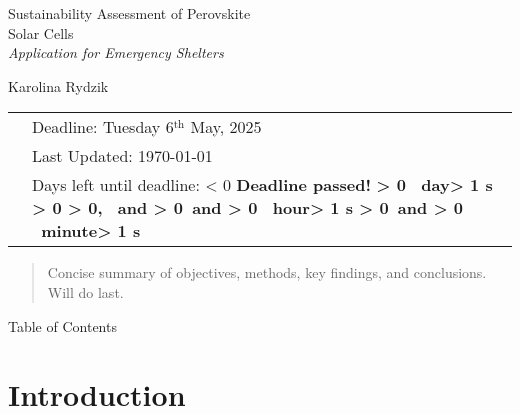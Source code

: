 \documentclass{article}
\newcounter{deadlineyear}\setcounter{deadlineyear}{2025}
\newcounter{deadlinemonth}\setcounter{deadlinemonth}{5} %
\newcounter{deadlineday}\setcounter{deadlineday}{6}
\newcounter{deadlinetime}\setcounter{deadlinetime}{0} %
\newcounter{mydatenumber}
\newcounter{currentdate}
\newcounter{daysdiff}
\newcounter{currenttime}
\newcounter{totalminutes}
\newcounter{displaydays}
\newcounter{remainingmins}
\newcounter{displayhours}
\newcounter{displaymins}
\newcommand{\timeUntilDeadline}{%
	\setmydatenumber{mydatenumber}{\thedeadlineyear}{\thedeadlinemonth}{\thedeadlineday}%
	\setmydatenumber{currentdate}{\the\year}{\the\month}{\the\day}%
	\setcounter{daysdiff}{\themydatenumber - \thecurrentdate}%
	\setcounter{currenttime}{\time}%
	\setcounter{totalminutes}{\thedaysdiff * 1440 + \thedeadlinetime - \thecurrenttime}%
	\ifnum\thetotalminutes < 0
	\textbf{\color{red}Deadline passed!}%
	\else
	\setcounter{displaydays}{\thetotalminutes / 1440}%
	\setcounter{remainingmins}{\thetotalminutes - \thedisplaydays * 1440}%
	\setcounter{displayhours}{\theremainingmins / 60}%
	\setcounter{displaymins}{\theremainingmins - \thedisplayhours * 60}%
	\textbf{%
		\ifnum\thedisplaydays > 0
		\thedisplaydays\ day\ifnum\thedisplaydays > 1 s\fi%
		\ifnum\thedisplayhours > 0
		\ifnum\thedisplaymins > 0, \else\ and \fi%
		\else
		\ifnum\thedisplaymins > 0\ and \fi%
		\fi%
		\fi%
		\ifnum\thedisplayhours > 0
		\thedisplayhours\ hour\ifnum\thedisplayhours > 1 s\fi%
		\ifnum\thedisplaymins > 0\ and \fi%
		\fi%
		\ifnum\thedisplaymins > 0
		\thedisplaymins\ minute\ifnum\thedisplaymins > 1 s\fi%
		\fi%
	}%
	\fi
}
\begin{document}
\thispagestyle{empty}
\vspace*{10em}

\Huge \noindent 
Sustainability Assessment of \textcolor{green!50!black}{Perovskite\\ Solar Cells}\\[1em]
\normalsize \textit{Application for Emergency Shelters}\\
\vspace*{4em}

\noindent \large Karolina Rydzik

\vspace*{\fill}

\normalsize
\hspace*{-2.9em}
\begin{tabular}{@{}l l@{}}
	& Deadline: Tuesday 6$^{\text{th}}$ May, 2025\\
	& Last Updated: \today\, \currenttime \\
	& Days left until deadline: \timeUntilDeadline \\
\end{tabular}

	\newpage\thispagestyle{empty}
	
	\begin{abstract} 
		Concise summary of objectives, methods, key findings, and conclusions. Will do last.
	\end{abstract}
	
	\newpage{}
	
	\noindent
	
	\huge Table of Contents\\
	
	\normalsize
	
	{
		\hypersetup{linkcolor=black}
		\tableofcontents
	}    


	\thispagestyle{empty}

	{
		\hypersetup{linkcolor=black}
		\tableofcontents
	}    
	
	
	\newpage{}
	\noindent{}\setcounter{page}{1}




\section{Introduction}
\end{document}
